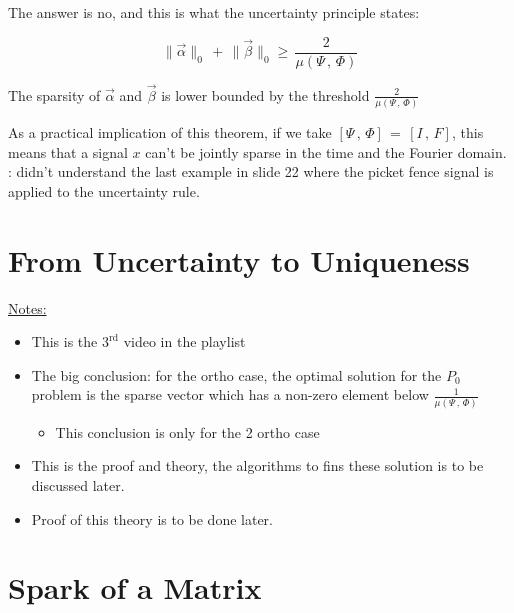 \documentclass[12pt,a4paper]{book}
\begin{document}
The answer is no, and this is what the uncertainty principle states:


\begin{equation}
    \lVert \Vec{\alpha} \rVert_0 \, + \, \lVert \Vec{\beta} \rVert_0 \geq \, \displaystyle\frac{2}{\mu(\Psi \, , \,\Phi )}
\end{equation}

The sparsity of $\Vec{\alpha}$ and $\Vec{\beta}$ is lower bounded by the threshold $\displaystyle\frac{2}{\mu(\Psi \, , \,\Phi )}$

As a practical implication of this theorem, if we take $[\Psi \, , \, \Phi] \, = \, [I \, , \, F]$, this means that a signal $x$ can't be jointly sparse in the time and the Fourier domain.\\

: didn't understand the last example in slide 22 where the picket fence signal is applied to the uncertainty rule.


\section{From Uncertainty to Uniqueness}

\underline{Notes:}\\

\begin{itemize}

    \item This is the $\mathrm{3}^\mathrm{rd}$ video in the playlist
    
    
    \item The big conclusion: for the ortho case, the optimal solution for the $P_0$ problem is the sparse vector which has a non-zero element below $\displaystyle\frac{1}{\mu(\Psi \, , \,\Phi )}$
    
        \begin{itemize}
            \item This conclusion is only for the 2 ortho case
        \end{itemize}
    
    \item This is the proof and theory, the algorithms to fins these solution is to be discussed later.
    
    \item Proof of this theory is to be done later.


\end{itemize}

\section{Spark of a Matrix}
\end{document}
